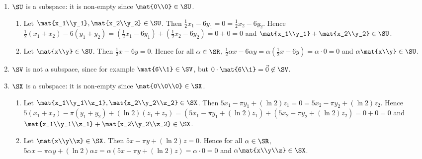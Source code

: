 \begin{exercises}
\begin{problist}
\begin{solution}
\begin{enumerate}
				\item $\SU$ is a subspace: it is non-empty since $\mat{0\\0}\in\SU$. 
				\begin{enumerate}
					\item Let $\mat{x_1\\y_1},\mat{x_2\\y_2}\in \SU$. Then $\frac{1}{2}x_1-6y_1=0=\frac{1}{2}x_2-6y_2$. Hence $\frac{1}{2}(x_1+x_2)-6(y_1+y_2)=(\frac{1}{2}x_1-6y_1)+(\frac{1}{2}x_2-6y_2)=0+0=0$ and $\mat{x_1\\y_1}+\mat{x_2\\y_2}\in\SU$.
					\item Let $\mat{x\\y}\in\SU$. Then $\frac{1}{2}x-6y=0$. Hence for all $\alpha\in\SR$, $\frac{1}{2}\alpha x-6\alpha y=\alpha(\frac{1}{2}x-6y)=\alpha\cdot 0=0$ and $\alpha\mat{x\\y}\in\SU$.
				\end{enumerate}

				\item $\SV$ is not a subspace, since for example $\mat{6\\1}\in\SV$, but $0\cdot\mat{6\\1}=\vec 0\not\in\SV$.

				\item $\SX$ is a subspace: it is non-empty since $\mat{0\\0\\0}\in\SX$. 
				\begin{enumerate}
					\item Let $\mat{x_1\\y_1\\z_1},\mat{x_2\\y_2\\z_2}\in \SX$. Then $5x_1-\pi y_1+(\ln 2)z_1=0=5x_2-\pi y_2+(\ln 2)z_2$. Hence $5(x_1+x_2)-\pi(y_1+y_2)+(\ln 2)(z_1+z_2)=(5x_1-\pi y_1+(\ln 2)z_1)+(5x_2-\pi y_2+(\ln 2)z_2)=0+0=0$ and $\mat{x_1\\y_1\\z_1}+\mat{x_2\\y_2\\z_2}\in\SX$.

					\item Let $\mat{x\\y\\z}\in\SX$. Then $5x-\pi y+(\ln 2)z=0$. Hence for all $\alpha\in\SR$, $5\alpha x-\pi\alpha y+(\ln 2)\alpha z=\alpha(5x-\pi y+(\ln 2)z)=\alpha\cdot 0=0$ and $\alpha\mat{x\\y\\z}\in\SX$.
				\end{enumerate}


\end{enumerate}
\end{solution}
\end{problist}
\end{exercises}
